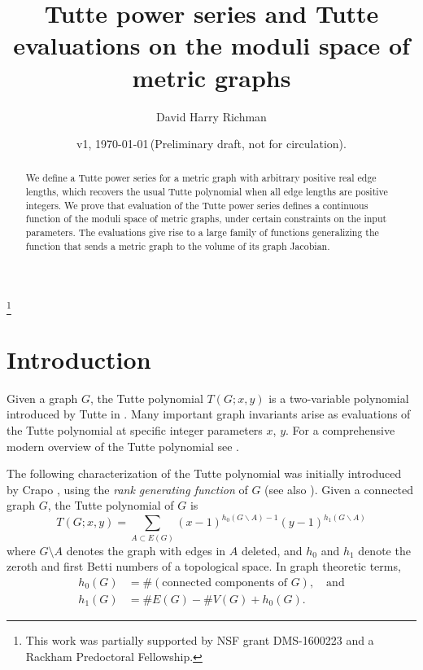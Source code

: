 \documentclass{amsart}
\theoremstyle{definition}
\begin{document}
\title[Tutte power series on metric graphs]{Tutte power series and Tutte evaluations on the moduli space of metric graphs}
\author{David Harry Richman}
\date{v1, \today  \,(Preliminary draft, not for circulation).}
\thanks{This work was partially supported by NSF grant DMS-1600223
and a Rackham Predoctoral Fellowship.}


\begin{abstract}
We define a %
Tutte power series for a metric graph with arbitrary positive real edge lengths, 
which recovers the usual Tutte polynomial when all edge lengths are positive integers.
We prove that %
evaluation of the Tutte power series
defines a continuous function of the moduli space of metric graphs,
under certain constraints on the input parameters.
The evaluations give rise to a large family of functions generalizing the function that sends a metric graph to the volume of its graph Jacobian.
\end{abstract}
\maketitle


\section{Introduction}
Given a graph $G$,
the Tutte polynomial $T(G;x,y)$ 
is 
 a two-variable polynomial %
introduced by Tutte in \cite{Tut}.
Many important graph invariants arise as evaluations of 
the Tutte polynomial %
at specific integer parameters $x$, $y$.
For a comprehensive modern overview of the Tutte polynomial see \cite{BO, EMM}.

The following characterization of the Tutte polynomial was initially introduced by Crapo \cite{Cra}, 
using the  {\em rank generating function} of $G$
(see also \cite[Definition 3]{EMM}).
Given a connected graph $G $, 
the Tutte polynomial of $G$ is 
\begin{equation}
\label{eq:tutte-graph}
T(G; x,y) = \sum_{A \subset E(G)} (x-1)^{h_0(G\backslash A) - 1}(y-1)^{h_1(G\backslash A)}
\end{equation}
where $G\setminus A$ denotes the graph with edges in $A$ deleted,
and $h_0$ and $h_1$ denote the zeroth and first Betti numbers of 
a topological space.
In graph theoretic terms,
\begin{align*}
h_0(G) &= \#(\text{connected components of }G), \quad\text{and}\\
h_1(G) &= \# E(G) - \# V(G) + h_0(G) .
\end{align*}
\end{document}

